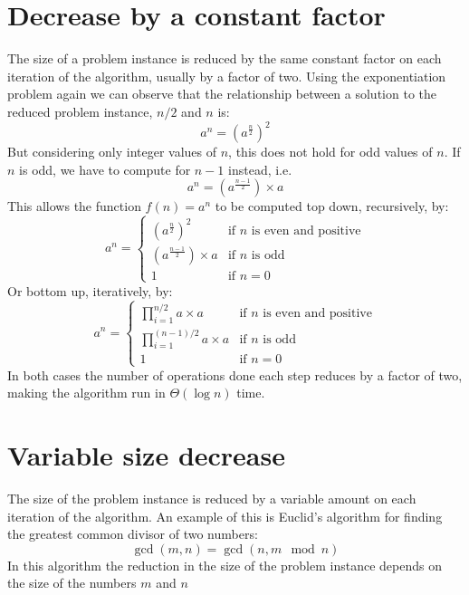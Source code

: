 \documentclass[12pt letter]{report}
\begin{document}
\section{Decrease by a constant factor}

The size of a problem instance is reduced  by the same constant factor on each iteration of the algorithm, usually by a
factor of two. Using the exponentiation problem again we can observe that the relationship between a solution to the
reduced problem instance, $n/2$ and $n$ is:
\[
  a^{n} = \left( a ^{\frac{n}{2}} \right)^{2}
\]
But considering only integer values of $n$, this does not hold for odd values of $n$. If $n$ is odd, we have to compute
for $n-1$ instead, i.e.
\[
  a^{n} = \left( a^{\frac{n-1}{2}} \right)\times a
\]
This allows the function $f \left( n \right) = a^{n} $ to be computed top down, recursively, by:
\[
  a^{n} = \begin{cases}
    \left( a^{\frac{n}{2}} \right) ^2         & \text{if $n$ is even and positive} \\
    \left( a^{\frac{n-1}{2}} \right) \times a & \text{if $n$ is odd}               \\
    1                                         & \text{if $n = 0$}
  \end{cases}
\]
Or bottom up, iteratively, by:
\[
  a^{n} = \begin{cases}
    \prod_{i = 1}^{n/2} a \times a     & \text{if $n$ is even and positive} \\
    \prod_{i = 1}^{(n-1)/2} a \times a & \text{if $n$ is odd}               \\
    1                                  & \text{if $n = 0$}
  \end{cases}
\]
In both cases the number of operations done each step reduces by a factor of two, making the algorithm run in $\Theta
  \left( \log n \right) $ time.

\section{Variable size decrease}

The size of the problem instance is reduced by a variable amount on each iteration of the algorithm. An example of this
is Euclid's algorithm for finding the greatest common divisor of two numbers:
\[
  \gcd \left( m, n \right)  = \gcd \left( n, m\mod n \right)
\]
In this algorithm the reduction in the size of the problem instance depends on the size of the numbers $m$ and $n$
\end{document}
